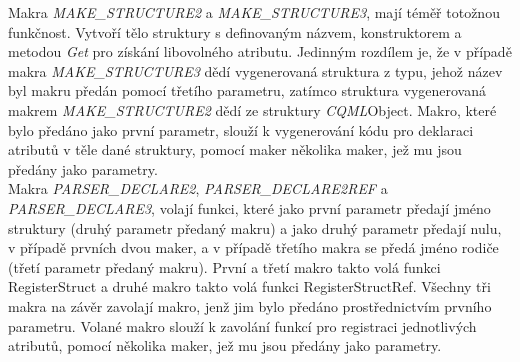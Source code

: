 \documentclass[11pt,twoside,a4paper]{book}
\begin{document}
{{\begin{ttemize}
{{\begin{lastlisting}[frame=single,caption=Řešení v pseudokódu problematického použití operátoru "." v přiřazovacím výroku,label=lst:var0N]
Makra \textit{MAKE\_STRUCTURE2} a \textit{MAKE\_STRUCTURE3}, mají téměř totožnou funkčnost. Vytvoří tělo struktury s definovaným názvem, konstruktorem a metodou \textit{Get} pro získání libovolného atributu. Jedinným rozdílem je, že v případě makra \textit{MAKE\_STRUCTURE3} dědí vygenerovaná struktura z typu, jehož název byl makru předán pomocí třetího parametru, zatímco struktura vygenerovaná makrem \textit{MAKE\_STRUCTURE2} dědí ze struktury \textit{CQML}Object. Makro, které bylo předáno jako první parametr, slouží k vygenerování kódu pro deklaraci atributů v těle dané struktury, pomocí maker několika maker, jež mu jsou předány jako parametry.\\

Makra \textit{PARSER\_DECLARE2}, \textit{PARSER\_DECLARE2REF} a \textit{PARSER\_DECLARE3}, volají funkci, které jako první parametr předají jméno struktury (druhý parametr předaný makru) a jako druhý parametr předají nulu, v případě prvních dvou maker, a v případě třetího makra se předá jméno rodiče (třetí parametr předaný makru). První a třetí makro takto volá funkci RegisterStruct a druhé makro takto volá funkci RegisterStructRef. Všechny tři makra na závěr zavolají makro, jenž jim bylo předáno prostřednictvím prvního parametru. Volané makro slouží k zavolání funkcí pro registraci jednotlivých atributů, pomocí několika maker, jež mu jsou předány jako parametry.\\


\end{lastlisting}}}
\end{ttemize}}}
\end{document}
